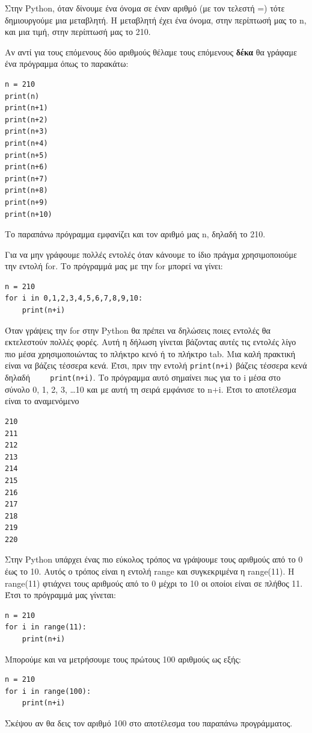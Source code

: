 Στην Python, όταν δίνουμε ένα όνομα σε έναν αριθμό (με τον τελεστή =) τότε δημιουργούμε μια μεταβλητή. Η μεταβλητή έχει ένα όνομα, στην περίπτωσή μας το n, και μια τιμή, στην περίπτωσή μας το 210.

Αν αντί για τους επόμενους δύο αριθμούς θέλαμε τους επόμενους \textbf{δέκα} θα γράφαμε ένα πρόγραμμα όπως το παρακάτω:
\begin{lstlisting}
n = 210
print(n)
print(n+1)
print(n+2)
print(n+3)
print(n+4)
print(n+5)
print(n+6)
print(n+7)
print(n+8)
print(n+9)
print(n+10)
\end{lstlisting}
Το παραπάνω πρόγραμμα εμφανίζει και τον αριθμό μας n, δηλαδή το 210.

Για να μην γράφουμε πολλές εντολές όταν κάνουμε το ίδιο πράγμα χρησιμοποιούμε την εντολή for.
Το πρόγραμμά μας με την for μπορεί να γίνει:
\begin{lstlisting}
n = 210
for i in 0,1,2,3,4,5,6,7,8,9,10:
    print(n+i)
\end{lstlisting}
Όταν γράψεις την for στην Python θα πρέπει να δηλώσεις ποιες εντολές θα εκτελεστούν πολλές φορές. Αυτή η δήλωση γίνεται βάζοντας αυτές τις εντολές λίγο πιο μέσα χρησιμοποιώντας το πλήκτρο κενό ή το πλήκτρο tab. Μια καλή πρακτική είναι να βάζεις τέσσερα κενά. Έτσι, πριν την εντολή \lstinline{print(n+i)} βάζεις τέσσερα κενά δηλαδή \lstinline[showspaces=true]{    print(n+i)}.
Το πρόγραμμα αυτό σημαίνει πως για το i μέσα στο σύνολο 0, 1, 2, 3, \ldots 10 και με αυτή τη σειρά εμφάνισε το n+i. Έτσι το αποτέλεσμα είναι το αναμενόμενο
\begin{lstlisting}
210
211
212
213
214
215
216
217
218
219
220
\end{lstlisting}

Στην Python υπάρχει ένας πιο εύκολος τρόπος να γράψουμε τους αριθμούς από το 0 έως το 10. Αυτός ο τρόπος είναι η εντολή range και συγκεκριμένα η range(11). Η range(11) φτιάχνει τους αριθμούς από το 0 μέχρι το 10 οι οποίοι είναι σε πλήθος 11. 
Έτσι το πρόγραμμά μας γίνεται:
\begin{lstlisting}
n = 210
for i in range(11):
    print(n+i)
\end{lstlisting}

Mπορούμε και να μετρήσουμε τους πρώτους 100 αριθμούς ως εξής:
\begin{lstlisting}
n = 210
for i in range(100):
    print(n+i)
\end{lstlisting}

Σκέψου αν θα δεις τον αριθμό 100 στο αποτέλεσμα του παραπάνω προγράμματος.

